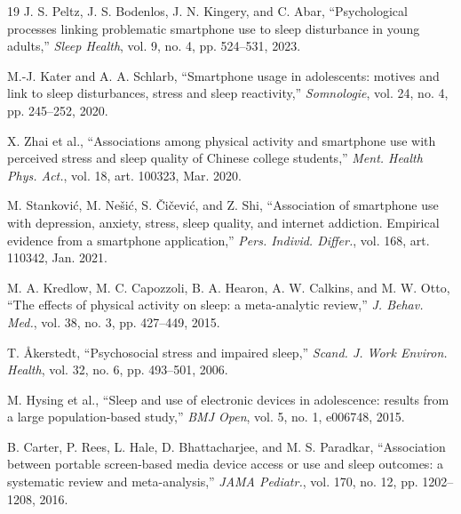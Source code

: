 \documentclass[conference]{IEEEtran}
\begin{document}
\begin{thebibliography}{19}
 J. S. Peltz, J. S. Bodenlos, J. N. Kingery, and C. Abar, ``Psychological processes linking problematic smartphone use to sleep disturbance in young adults,'' \emph{Sleep Health}, vol. 9, no. 4, pp. 524--531, 2023.

 M.-J. Kater and A. A. Schlarb, ``Smartphone usage in adolescents: motives and link to sleep disturbances, stress and sleep reactivity,'' \emph{Somnologie}, vol. 24, no. 4, pp. 245--252, 2020.

 X. Zhai et al., ``Associations among physical activity and smartphone use with perceived stress and sleep quality of Chinese college students,'' \emph{Ment. Health Phys. Act.}, vol. 18, art. 100323, Mar. 2020.

 M. Stanković, M. Nešić, S. Čičević, and Z. Shi, ``Association of smartphone use with depression, anxiety, stress, sleep quality, and internet addiction. Empirical evidence from a smartphone application,'' \emph{Pers. Individ. Differ.}, vol. 168, art. 110342, Jan. 2021.

 M. A. Kredlow, M. C. Capozzoli, B. A. Hearon, A. W. Calkins, and M. W. Otto, ``The effects of physical activity on sleep: a meta-analytic review,'' \emph{J. Behav. Med.}, vol. 38, no. 3, pp. 427--449, 2015.

 T. Åkerstedt, ``Psychosocial stress and impaired sleep,'' \emph{Scand. J. Work Environ. Health}, vol. 32, no. 6, pp. 493--501, 2006.

 M. Hysing et al., ``Sleep and use of electronic devices in adolescence: results from a large population-based study,'' \emph{BMJ Open}, vol. 5, no. 1, e006748, 2015.

 B. Carter, P. Rees, L. Hale, D. Bhattacharjee, and M. S. Paradkar, ``Association between portable screen-based media device access or use and sleep outcomes: a systematic review and meta-analysis,'' \emph{JAMA Pediatr.}, vol. 170, no. 12, pp. 1202--1208, 2016.

\end{thebibliography}
\end{document}
